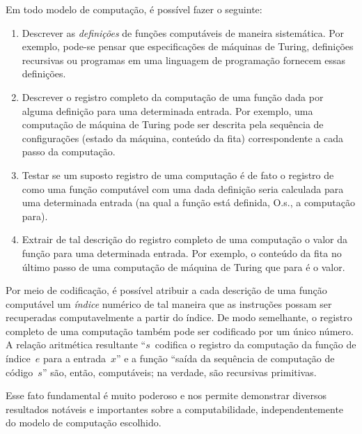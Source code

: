 \documentclass[../../../include/open-logic-section]{subfiles}
\begin{document}

Em todo modelo de computação, é possível fazer o seguinte:
\begin{enumerate}
\item Descrever as \emph{definições} de funções computáveis de maneira
  sistemática. Por exemplo, pode-se pensar que especificações de
  máquinas de Turing, definições recursivas ou programas em uma
  linguagem de programação fornecem essas definições.
\item Descrever o registro completo da computação de uma função dada
  por alguma definição para uma determinada entrada. Por exemplo, uma
  computação de máquina de Turing pode ser descrita pela sequência de
  configurações (estado da máquina, conteúdo da fita) correspondente
  a cada passo da computação.
\item Testar se um suposto registro de uma computação é de fato o
  registro de como uma função computável com uma dada definição seria
  calculada para uma determinada entrada (na qual a função está
  definida, O.s.\@, a computação para).
\item Extrair de tal descrição do registro completo de uma computação
  o valor da função para uma determinada entrada. Por exemplo, o
  conteúdo da fita no último passo de uma computação de máquina de
  Turing que para é o valor.
\end{enumerate}

Por meio de codificação, é possível atribuir a cada descrição de uma
função computável um \emph{índice} numérico de tal maneira que as
instruções possam ser recuperadas computavelmente a partir do índice.
De modo semelhante, o registro completo de uma computação também pode
ser codificado por um único número. A relação aritmética resultante
``$s$~codifica o registro da computação da função de índice~$e$ para
a entrada~$x$'' e a função ``saída da sequência de computação de
código~$s$'' são, então, computáveis; na verdade, são recursivas
primitivas.

Esse fato fundamental é muito poderoso e nos permite demonstrar
diversos resultados notáveis e importantes sobre a computabilidade,
independentemente do modelo de computação escolhido.
\end{document}
